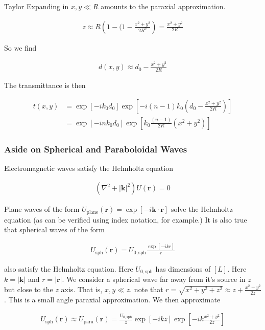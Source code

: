 \documentclass[12pt]{article}
\newcommand{\bv}[1]{\mathbf{#1}}
\begin{document}
Taylor Expanding in $x,y \ll R$ amounts to the paraxial approximation.

\begin{align}
z \approx R \left(1 - (1 - \frac{x^2+y^2}{2R^2}\right) = \frac{x^2+y^2}{2R}
\end{align}

So we find

\begin{align}
d(x,y) \approx d_0 - \frac{x^2 + y^2}{2R}
\end{align}

The transmittance is then

\begin{align}
t(x,y) &= \exp[-ik_0d_0] \exp\left[-i(n-1)k_0\left(d_0 - \frac{x^2+y^2}{2R}\right)\right]\\
&= \exp[-i n k_0 d_0] \exp\left[k_0\frac{(n-1)}{2R} (x^2+y^2)\right]
\end{align}

\subsubsection{Aside on Spherical and Paraboloidal Waves}

Electromagnetic waves satisfy the Helmholtz equation

\begin{align}
(\nabla^2+|\bv{k}|^2)U(\bv{r}) = 0
\end{align}

Plane waves of the form $U_{\text{plane}}(\bv{r}) = \exp[-i \bv{k}\cdot\bv{r}]$ solve the Helmholtz equation (as can be verified using index notation, for example.) It is also true that spherical waves of the form

\begin{align}
U_{\text{sph}}(\bv{r}) = U_{0,\text{sph}}\frac{\exp[-i k r]}{r}
\end{align}

also satisfy the Helmholtz equation. Here $U_{0,\text{sph}}$ has dimensions of $[L]$. Here $k = |\bv{k}|$ and $r = |\bv{r}|$. We consider a spherical wave far away from it's source in $z$ but close to the $z$ axis. That is, $x,y \ll z$. note that $r = \sqrt{x^2+y^2+z^2} \approx z+\frac{x^2+y^2}{2z}$. This is a small angle paraxial approximation. We then approximate

\begin{align}
U_{\text{sph}}(\bv{r}) \approx U_{\text{para}}(\bv{r}) = \frac{U_{0,\text{sph}}}{z} \exp[-ikz] \exp\left[-ik\frac{x^2+y^2}{2z}\right]
\end{align}
\end{document}

